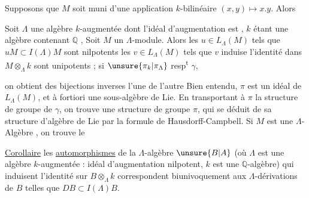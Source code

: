 Supposons que $M$ soit muni d'une
application $k$-bilinéaire $(x,y)\longmapsto x.y$. Alors
\diagram{\[
\begin{array}{ccc}
\xi(x.y)=(\xi x)y+x(\xi y)&\Longleftrightarrow&g(x.y)=(gx)(g.y)\\
\uline{\text{dérivations}}&&\uline{\text{automorphismes}}\\
\text{nilpotentes}&&\text{unipotents}
\end{array}
\]}


Soit $\Lambda$ une algèbre $k$-augmentée dont l'idéal
d'augmentation est 
, $k$ étant une
algèbre contenant $\mathbb Q$ ,
Soit $M$ un $\Lambda$-module.
Alors les $u\in L_\Lambda(M)$ tels que $uM\subset I(\Lambda)M$
sont nilpotents 
 les
$v\in L_\Lambda(M)$ tels que $v$ induise l'identité
dans $M\otimes_\Lambda k$ sont unipotents ; si 
 $\unsure{\pi_k|\pi_\Lambda}$ resp\textsuperscript{t} $\gamma$,



on obtient des bijections inverses l'une de l'autre
\diagram{\begin{tikzcd}[ampersand replacement=\&]
\pi \arrow[r,bend left=15,"\exp"] \& \gamma \arrow[l,bend left=15,"\log"]
\end{tikzcd}}
Bien entendu, $\pi$ est un idéal  de $L_\Lambda(M)$, et
à fortiori une sous-algèbre de Lie. En
transportant à $\pi$ la structure de groupe de
$\gamma$, on trouve une structure de groupe 
$\pi$, qui se déduit de sa structure
d'algèbre de Lie par la formule de
Hausdorff-Campbell. Si $M$ est une
$\Lambda$-Algèbre , on trouve le

\uline{Corollaire} les \uline{automorphismes} de la
$\Lambda$-algèbre \uline{$\unsure{B|A}$} (où $\Lambda$ est une algèbre
$k$-augmentée :  idéal d'augmentation
nilpotent, $k$ est une $\mathbb Q$-algèbre)
qui induisent l'identité sur $B\otimes_\Lambda k$
correspondent biunivoquement aux
$\Lambda$-dérivations  de $B$ telles que $DB\subset I(\Lambda)B$.

